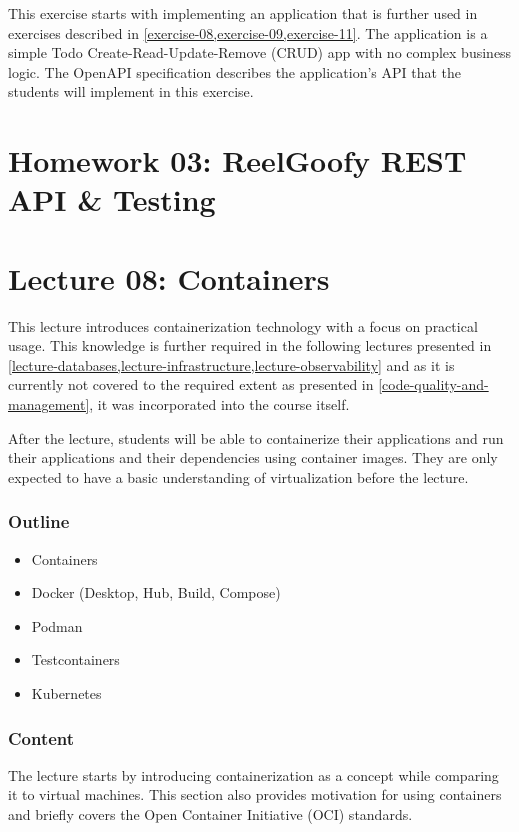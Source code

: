 \documentclass[
  digital,
  color,
  oneside,
  nosansbold,
  nocolorbold,
  nolof,
  nolot,
]{fithesis4}
\begin{document}
This exercise starts with implementing an application that is further used in exercises described in \cref{exercise-08,exercise-09,exercise-11}. The application is a simple Todo Create-Read-Update-Remove (CRUD) app with no complex business logic. The OpenAPI\cite{open-api} specification describes the application's API that the students will implement in this exercise.

\section{Homework 03: ReelGoofy REST API \& Testing}

\section{Lecture 08: Containers}\label{lecture-containers}

This lecture introduces containerization technology with a focus on practical usage. This knowledge is further required in the following lectures presented in \cref{lecture-databases,lecture-infrastructure,lecture-observability} and as it is currently not covered to the required extent as presented in \cref{code-quality-and-management}, it was incorporated into the course itself.

After the lecture, students will be able to containerize their applications and run their applications and their dependencies using container images. They are only expected to have a basic understanding of virtualization before the lecture.

\subsubsection{Outline}

\begin{itemize}
    \item Containers
    \item Docker (Desktop, Hub, Build, Compose)
    \item Podman
    \item Testcontainers
    \item Kubernetes
\end{itemize}

\subsubsection{Content}

The lecture starts by introducing containerization as a concept while comparing it to virtual machines. This section also provides motivation for using containers and briefly covers the Open Container Initiative (OCI) standards.
\end{document}
